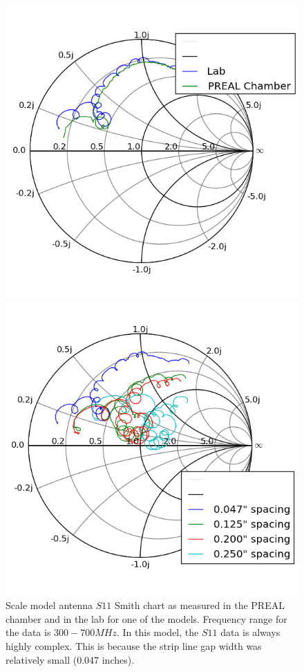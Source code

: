\begin{figure}[htb]
\centering
\begin{minipage}[b]{0.47\textwidth}
\centering
\includegraphics[width=0.95\linewidth]{SCIHI_system/figures/HIbiscus_S11_model_Smith_PREAL.png}
\caption{Scale model antenna $S11$ Smith chart as measured in the PREAL chamber and in the lab for one of the models. Frequency range for the data is $300-700 MHz$. In this model, the $S11$ data is always highly complex. This is because the strip line gap width was relatively small (0.047 inches). }
\label{Fig:HIS11_model_Smith}
\end{minipage}%
\begin{minipage}[b]{0.02\textwidth}
\hspace{1cm}
\end{minipage}%
\begin{minipage}[b]{0.47\textwidth}
\centering
\includegraphics[width=0.95\linewidth]{SCIHI_system/figures/HIbiscus_S11_model_spacing_Smith.png}

\end{minipage}
\end{figure}
